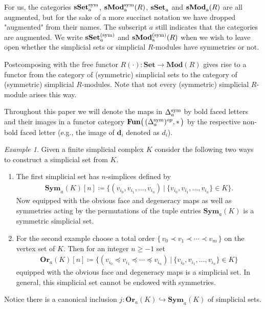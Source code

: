 \documentclass[12pt]{amsart}
\theoremstyle{plain}
\numberwithin{lemma}{\DefaultNumberTheoremWithin}
\numberwithin{claim}{\DefaultNumberTheoremWithin}
\numberwithin{theorem}{\DefaultNumberTheoremWithin}
\numberwithin{corollary}{\DefaultNumberTheoremWithin}
\numberwithin{proposition}{\DefaultNumberTheoremWithin}
\numberwithin{conjecture}{\DefaultNumberTheoremWithin}
\theoremstyle{definition}
\theoremstyle{definition}
\numberwithin{question}{\DefaultNumberTheoremWithin}
\theoremstyle{definition}
\numberwithin{problem}{\DefaultNumberTheoremWithin}
\theoremstyle{remark}
\numberwithin{remark}{\DefaultNumberTheoremWithin}
\theoremstyle{remark}
\newtheorem{example}{Example}
\numberwithin{example}{\DefaultNumberTheoremWithin}
\def\blt{*}
\def\letbe{\coloneqq}
\def\Dsym{\Delta^{\textnormal{sym}}_a}
\def\bd{\boldsymbol d}
\newcommand{\sMod}[2]{\mathbf{sMod}_\textnormal{a}^{\textnormal{#1}}(#2)}  %
\newcommand{\sSet}[1]{\mathbf{sSet}_a^\textnormal{#1}} %
\begin{document}
 
For us, the categories $\sSet{sym}$, $\sMod{sym}{R}$, 
$\sSet{}$ and
$\sMod{}{R}$
are all augmented, but for the sake of a more succinct notation we 
have dropped "augmented" from their names. The subscript $a$ still indicates
that the categories are augmented. We write $\sSet{(sym)}$ and $\sMod{(sym)}{R}$ when we wish to leave open whether the simplicial sets or simplicial \(R\)-modules have symmetries or not.

Postcomposing with the free functor $R(\cdot)\colon\mathbf{Set}\to \mathbf{Mod}(R)$ gives rise to a functor from the category of (symmetric) simplicial sets to the category of (symmetric) simplicial $R$-modules. Note that not every (symmetric) simplicial $R$-module arises this way. 


\medskip
Throughout this paper we will denote
the maps in $\Dsym$ by bold faced letters and their
images in a functor category 
$\mathbf{Fun}\big(\,(\Dsym)^{op},\blt\,\big)$
by the respective non-bold faced letter (e.g., 
the image of $\bd_i$ denoted as $d_i$).


\begin{example} \label{SymOr}
    Given a finite simplicial complex $K$ consider the following two ways to construct a simplicial set from $K$.
    \begin{enumerate}
        
        \item The first simplicial set has $n$-simplices defined by
        \begin{align*}
            \mathbf{Sym}_a(K)[n] \letbe \big\{(v_{i_0}, v_{i_1}, \dots , v_{i_n})~\big\vert~\{v_{i_0},v_{i_1},\dots ,v_{i_n}\}\in K\big\}.
        \end{align*}
        Now equipped with the obvious face and degeneracy maps as well as symmetries acting by the permutations of the tuple entries $\mathbf{Sym}_a(K)$ is a symmetric simplicial set. 
        \item For the second example choose a total order $\{\,v_0 \prec v_1 \prec \cdots  \prec v_m\, \}$ on the vertex set of $K$. Then for an 
        integer $n \geq -1$
        set
    \begin{align*}
    \mathbf{Or}_a(K)[n]\letbe \big\{(v_{i_0}\preceq v_{i_1}\preceq \cdots \preceq v_{i_n})~\big\vert~\{v_{i_0},v_{i_1},\dots ,v_{i_n}\}\in K\big\}
    \end{align*}
        equipped with the obvious face and degeneracy maps is a simplicial set. In general, this simplicial set cannot be endowed with symmetries.
    \end{enumerate}
    Notice there is a canonical inclusion $j\colon\mathbf{Or}_a(K)\hookrightarrow \mathbf{Sym}_a(K)$ of simplicial sets.
\end{example}
\end{document}
